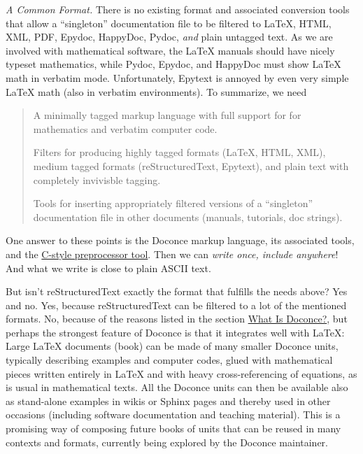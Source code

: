 \documentclass[a4paper,english]{article}
\begin{document}
\emph{A Common Format.} There is no existing format and associated
conversion tools that allow a ``singleton'' documentation file to be
filtered to LaTeX, HTML, XML, PDF, Epydoc, HappyDoc, Pydoc, \emph{and} plain
untagged text. As we are involved with mathematical software, the
LaTeX manuals should have nicely typeset mathematics, while Pydoc,
Epydoc, and HappyDoc must show LaTeX math in verbatim mode.
Unfortunately, Epytext is annoyed by even very simple LaTeX math (also
in verbatim environments). To summarize, we need
%
\begin{quote}
\setcounter{listcnt0}{0}
\begin{list}{.}
{
\setlength{\rightmargin}{\leftmargin}
}

\item A minimally tagged markup language with full support for
for mathematics and verbatim computer code.

\item Filters for producing highly tagged formats (LaTeX, HTML, XML),
medium tagged formats (reStructuredText, Epytext), and plain
text with completely invivisble tagging.

\item Tools for inserting appropriately filtered versions of a ``singleton''
documentation file in other documents (manuals, tutorials, doc strings).
\end{list}

\end{quote}

One answer to these points is the Doconce markup language, its associated
tools, and the \href{http://code.google.com/p/preprocess/}{C-style preprocessor tool}.
Then we can \emph{write once, include anywhere}!
And what we write is close to plain ASCII text.

But isn't reStructuredText exactly the format that fulfills the needs
above? Yes and no. Yes, because reStructuredText can be filtered to a
lot of the mentioned formats. No, because of the reasons listed
in the section \hyperref[id1]{What Is Doconce?}, but perhaps the strongest feature
of Doconce is that it integrates well with LaTeX: Large LaTeX documents (book)
can be made of many smaller Doconce units, typically describing examples
and computer codes, glued with mathematical pieces written entirely
in LaTeX and with heavy cross-referencing of equations, as is usual
in mathematical texts. All the Doconce units can then be available
also as stand-alone examples in wikis or Sphinx pages and thereby used
in other occasions (including software documentation and teaching material).
This is a promising way of composing future books of units that can
be reused in many contexts and formats, currently being explored by
the Doconce maintainer.
\end{document}
